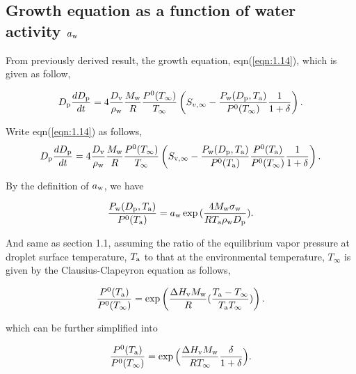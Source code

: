 \documentclass[12pt]{article}
\begin{document}
\subsection{Growth equation as a function of water activity $a_{\rm w}$}

From previously derived result, the growth equation, eqn(\ref{eqn:1.14}), which is given as follow,

\begin{equation}\label{2.1}
D_{\rm p}\frac{dD_{\rm p}}{dt}=4 \frac{D_{\rm v}} {\rho_{\rm w}} \frac{M_{\rm w}}{R} \frac{P^{\rm 0}(T_{\infty})} {T_{\infty}} \left(S_{v, \infty} - \frac{P_{\rm w}(D_{\rm p}, T_{\rm a})}{P^{\rm 0}(T_{\infty})} \frac{1}{1+\delta}\right).
\end{equation}

Write eqn(\ref{eqn:1.14}) as follows,
\begin{equation}\label{eqn:2.2}
D_{\rm p}\frac{dD_{\rm p}}{dt}=4 \frac{D_{\rm v}} {\rho_{\rm w}} \frac{M_{\rm w}}{R} \frac{P^{\rm 0}(T_{\infty})} {T_{\infty}} \left(S_{\rm v, \infty} - \frac{P_{\rm w}(D_{\rm p}, T_{\rm a})}{P^{\rm 0}(T_{\rm a})} \frac{P^{\rm 0}(T_{\rm a})}{P^{\rm 0}(T_{\infty})}\frac{1}{1+\delta}\right).
\end{equation}

By the definition of $a_{\rm w}$, we have

\begin{equation}\label{eqn:2.3}
\frac{P_{\rm w}(D_{\rm p}, T_{\rm a})}{P^{\rm 0}(T_{\rm a})}=a_{\rm w}\exp{(\frac{4 M_{\rm w} \sigma_{\rm w}}{R T_{\rm a} \rho_{\rm w}D_{\rm p}})}.
\end{equation}

And same as section 1.1, assuming the ratio of the equilibrium vapor pressure at droplet surface temperature, $T_{\rm a}$ to that at the environmental temperature, $T_{\infty}$ is given by the Clausius-Clapeyron equation as follows,
  
\begin{equation}\label{eqn:2.4}
\frac{P^{\rm 0}(T_{\rm a})}{P^{\rm 0}(T_{\infty})}=\exp \left(\frac{\Delta H_{\rm v} M_{\rm w}}{R} (\frac{T_{\rm a}-T_{\infty}}{T_{\rm a} T_{\infty}})\right).
\end{equation}

which can be further simplified into 

\begin{equation}\label{eqn:2.5}
\frac{P^{\rm 0}(T_{\rm a})}{P^{\rm 0}(T_{\infty})}=\exp \Big(\frac{\Delta H_{\rm v} M_{\rm w}}{R T_{\infty}} \frac{\delta}{1+\delta}\Big).
\end{equation}
\end{document}
